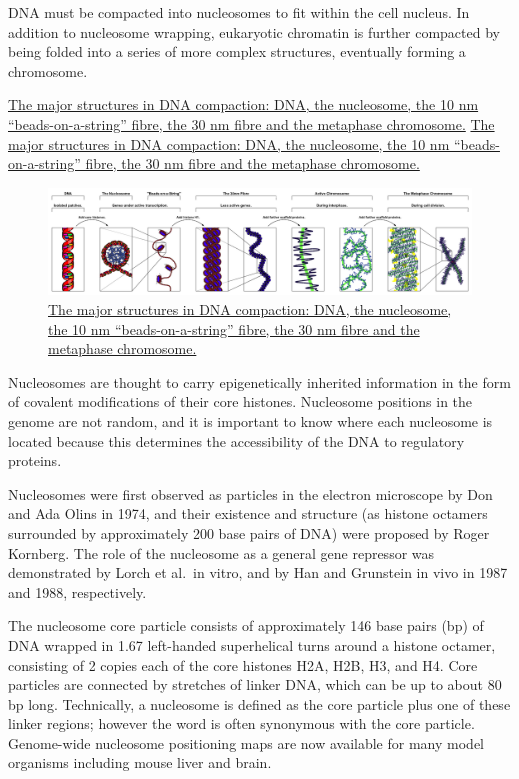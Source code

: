 DNA must be compacted into nucleosomes to fit within the cell nucleus. In addition to nucleosome wrapping, eukaryotic chromatin is further compacted by being folded into a series of more complex structures, eventually forming a chromosome.

\href{https://commons.wikimedia.org/wiki/File:Chromatin_Structures.png}{The major structures in DNA compaction: DNA, the nucleosome, the 10 nm ``beads-on-a-string'' fibre, the 30 nm fibre and the metaphase chromosome.} \href{https://commons.wikimedia.org/wiki/File:Chromatin_Structures.png}{The major structures in DNA compaction: DNA, the nucleosome, the 10 nm ``beads-on-a-string'' fibre, the 30 nm fibre and the metaphase chromosome.}

\begin{figure}

{\centering \includegraphics[width=0.7\linewidth]{./figures/chromosomes/Chromatin_Structures} 

}

\caption{\href{https://commons.wikimedia.org/wiki/File:Chromatin_Structures.png}{The major structures in DNA compaction: DNA, the nucleosome, the 10 nm ``beads-on-a-string'' fibre, the 30 nm fibre and the metaphase chromosome.}}\label{fig:structure}
\end{figure}

Nucleosomes are thought to carry epigenetically inherited information in the form of covalent modifications of their core histones. Nucleosome positions in the genome are not random, and it is important to know where each nucleosome is located because this determines the accessibility of the DNA to regulatory proteins.

Nucleosomes were first observed as particles in the electron microscope by Don and Ada Olins in 1974, and their existence and structure (as histone octamers surrounded by approximately 200 base pairs of DNA) were proposed by Roger Kornberg. The role of the nucleosome as a general gene repressor was demonstrated by Lorch et al.~in vitro, and by Han and Grunstein in vivo in 1987 and 1988, respectively.

The nucleosome core particle consists of approximately 146 base pairs (bp) of DNA wrapped in 1.67 left-handed superhelical turns around a histone octamer, consisting of 2 copies each of the core histones H2A, H2B, H3, and H4. Core particles are connected by stretches of linker DNA, which can be up to about 80 bp long. Technically, a nucleosome is defined as the core particle plus one of these linker regions; however the word is often synonymous with the core particle. Genome-wide nucleosome positioning maps are now available for many model organisms including mouse liver and brain.

